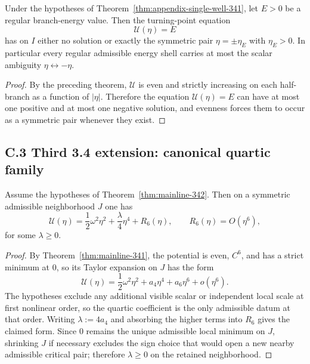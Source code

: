 \begin{proposition}
\label{prop:symmetric-turning-pair-341}
Under the hypotheses of Theorem~\ref{thm:appendix-single-well-341}, let $E>0$ be a regular branch-energy value. Then the turning-point equation
\[
  \mathcal U(\eta)=E
\]
has on $I$ either no solution or exactly the symmetric pair $\eta=\pm\eta_E$ with $\eta_E>0$. In particular every regular admissible energy shell carries at most the scalar ambiguity $\eta\leftrightarrow-\eta$.
\end{proposition}

\begin{proof}
By the preceding theorem, $\mathcal U$ is even and strictly increasing on each half-branch as a function of $|\eta|$. Therefore the equation $\mathcal U(\eta)=E$ can have at most one positive and at most one negative solution, and evenness forces them to occur as a symmetric pair whenever they exist.
\end{proof}

\subsection*{C.3 Third 3.4 extension: canonical quartic family}

\begin{proposition}
\label{prop:appendix-342a}
Assume the hypotheses of Theorem~\ref{thm:mainline-342}. Then on a symmetric admissible neighborhood $J$ one has
\[
  \mathcal U(\eta)=\frac12\omega^2\eta^2+\frac{\lambda}{4}\eta^4+R_6(\eta),
  \qquad R_6(\eta)=O(\eta^6),
\]
for some $\lambda\ge 0$.
\end{proposition}

\begin{proof}
By Theorem~\ref{thm:mainline-341}, the potential is even, $C^6$, and has a strict minimum at $0$, so its Taylor expansion on $J$ has the form
\[
  \mathcal U(\eta)=\frac12\omega^2\eta^2+a_4\eta^4+a_6\eta^6+o(\eta^6).
\]
The hypotheses exclude any additional visible scalar or independent local scale at first nonlinear order, so the quartic coefficient is the only admissible datum at that order. Writing $\lambda:=4a_4$ and absorbing the higher terms into $R_6$ gives the claimed form. Since $0$ remains the unique admissible local minimum on $J$, shrinking $J$ if necessary excludes the sign choice that would open a new nearby admissible critical pair; therefore $\lambda\ge 0$ on the retained neighborhood.
\end{proof}


